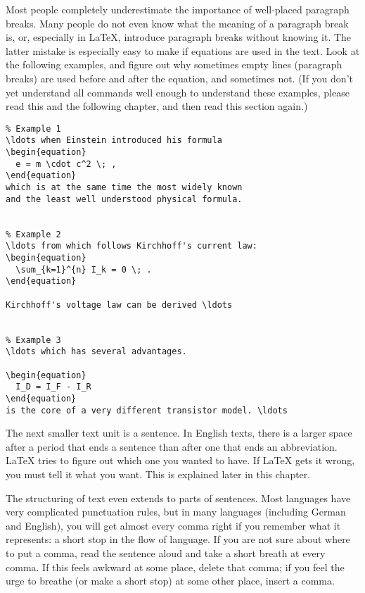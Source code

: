 Most people completely underestimate the importance of well-placed
paragraph breaks.  Many people do not even know what the meaning of
a paragraph break is, or, especially in \LaTeX, introduce paragraph
breaks without knowing it.  The latter mistake is especially easy to
make if equations are used in the text.  Look at the following
examples, and figure out why sometimes empty lines (paragraph breaks)
are used before and after the equation, and sometimes not.  (If you
don't yet understand all commands well enough to understand these
examples, please read this and the following chapter, and then read
this section again.)

\begin{code}
\begin{verbatim}
% Example 1
\ldots when Einstein introduced his formula 
\begin{equation} 
  e = m \cdot c^2 \; , 
\end{equation} 
which is at the same time the most widely known 
and the least well understood physical formula. 


% Example 2
\ldots from which follows Kirchhoff's current law:
\begin{equation} 
  \sum_{k=1}^{n} I_k = 0 \; .
\end{equation} 

Kirchhoff's voltage law can be derived \ldots


% Example 3
\ldots which has several advantages.

\begin{equation} 
  I_D = I_F - I_R
\end{equation} 
is the core of a very different transistor model. \ldots
\end{verbatim}
\end{code} 

The next smaller text unit is a sentence.  In English texts, there is
a larger space after a period that ends a sentence than after one
that ends an abbreviation.  \LaTeX{} tries to figure out which one
you wanted to have.  If \LaTeX{} gets it wrong, you must tell it what
you want.  This is explained later in this chapter.

The structuring of text even extends to parts of sentences.  Most
languages have very complicated punctuation rules, but in many
languages (including German and English), you will get almost every
comma right if you remember what it represents: a short stop in the
flow of language.  If you are not sure about where to put a comma,
read the sentence aloud and take a short breath at every comma.  If
this feels awkward at some place, delete that comma; if you feel the
urge to breathe (or make a short stop) at some other place, insert a
comma.

